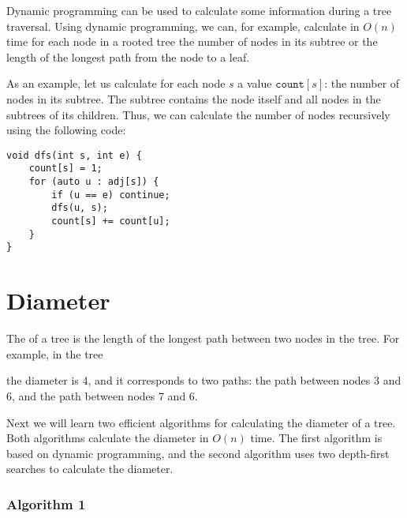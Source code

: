 Dynamic programming can be used to calculate
some information during a tree traversal.
Using dynamic programming, we can, for example,
calculate in $O(n)$ time for each node
in a rooted tree the
number of nodes in its subtree
or the length of the longest path from the node
to a leaf.

As an example, let us calculate for each node $s$
a value $\texttt{count}[s]$: the number of nodes in its subtree.
The subtree contains the node itself and
all nodes in the subtrees of its children.
Thus, we can calculate the number of nodes
recursively using the following code:

\begin{lstlisting}
void dfs(int s, int e) {
    count[s] = 1;
    for (auto u : adj[s]) {
        if (u == e) continue;
        dfs(u, s);
        count[s] += count[u];
    }
}
\end{lstlisting}

\section{Diameter}


The  of a tree
is the length of the longest path
between two nodes in the tree.
For example, in the tree
\begin{center}
\end{center}
the diameter is 4, and it corresponds to two paths:
the path between nodes 3 and 6,
and the path between nodes 7 and 6.

Next we will learn two efficient algorithms
for calculating the diameter of a tree.
Both algorithms calculate the diameter in $O(n)$ time.
The first algorithm is based on dynamic programming,
and the second algorithm uses two depth-first searches
to calculate the diameter.

\subsubsection{Algorithm 1}

